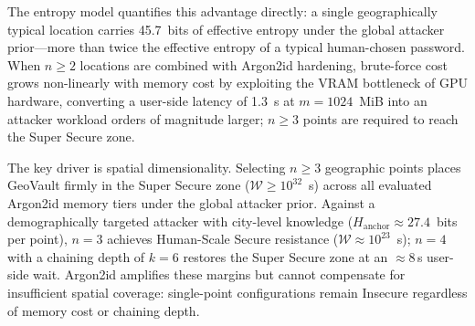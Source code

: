 \documentclass[mathematics,article,accept,pdftex,moreauthors]{Definitions/mdpi}
\begin{document}
{The entropy model quantifies this advantage directly: a single geographically typical location carries 45.7~bits of effective entropy under the global attacker prior---more than twice the effective entropy of a typical human-chosen password. When $n \geq 2$ locations are combined with Argon2id hardening, brute-force cost grows non-linearly with memory cost by exploiting the VRAM bottleneck of GPU hardware, converting a user-side latency of 1.3~s at $m=1024$~MiB into an attacker workload orders of magnitude larger; $n \geq 3$ points are required to reach the Super Secure zone.}

{The key driver is spatial dimensionality. Selecting $n \geq 3$ geographic points places GeoVault firmly in the Super Secure zone ($\mathcal{W} \geq 10^{32}$~s) across all evaluated Argon2id memory tiers under the global attacker prior. Against a demographically targeted attacker with city-level knowledge ($H_\text{anchor} \approx 27.4$~bits per point), $n=3$ achieves Human-Scale Secure resistance ($\mathcal{W} \approx 10^{23}$~s); $n=4$ with a chaining depth of $k=6$ restores the Super Secure zone at an $\approx$8\,s user-side wait. Argon2id amplifies these margins but cannot compensate for insufficient spatial coverage: single-point configurations remain Insecure regardless of memory cost or chaining depth.}
\end{document}
